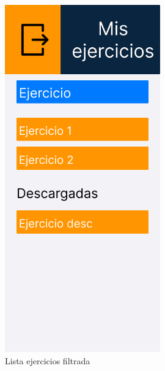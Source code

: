 \begin{figure}[H]
   \centering
    \includegraphics[width=0.6\textwidth]{fotos/Frame 41.png}
    \caption{Lista ejercicios filtrada}
    \label{fig:Lista ejercicios filtrada}
\end{figure}
